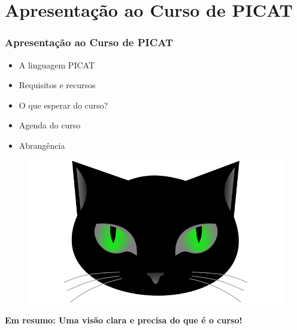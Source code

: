 \section{Apresentação ao Curso de PICAT}


\begin{frame}[fragile]
\frametitle{Apresentação ao Curso de PICAT}
\begin{minipage}{0.47\textwidth}
    \begin{itemize}
        \item A linguagem PICAT
        \item Requisitos e recursos
        \item O que esperar do curso?
        \item Agenda do curso
        \item Abrangência

    \end{itemize}
\end{minipage}
\begin{minipage}{0.5\textwidth}
\begin{figure}[ht!]
\begin{center}
\includegraphics[width=1.2\textwidth, height=0.40\textheight]{figures/logo_picat_alex.jpg}
\end{center}
\end{figure}
\end{minipage}

\pause
\begin{center}
\textbf{Em resumo: Uma visão clara e precisa do que é o curso!}
 \end{center}


\end{frame}


